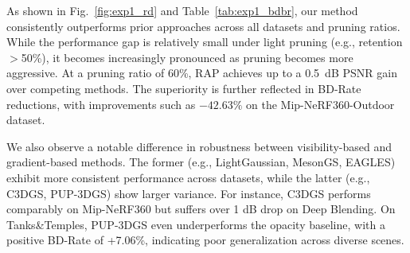\begin{table}[t]
    \centering
    \caption{BD-Rate (\%) comparison of pruning-based Gaussian Splatting methods relative to the opacity baseline. Lower BD-Rate indicates better rate–distortion efficiency}
    \label{tab:exp1_bdbr}
    \vspace{-1.5em}
\end{table}
As shown in Fig.~\ref{fig:exp1_rd} and Table~\ref{tab:exp1_bdbr}, our method consistently outperforms prior approaches across all datasets and pruning ratios. 
While the performance gap is relatively small under light pruning (e.g., retention $>$50\%), it becomes increasingly pronounced as pruning becomes more aggressive. 
At a pruning ratio of 60\%, RAP achieves up to a 0.5~dB PSNR gain over competing methods. 
The superiority is further reflected in BD-Rate reductions, with improvements such as $-42.63\%$ on the Mip-NeRF360-Outdoor dataset.


We also observe a notable difference in robustness between visibility-based and gradient-based methods. The former (e.g., LightGaussian, MesonGS, EAGLES) exhibit more consistent performance across datasets, while the latter (e.g., C3DGS, PUP-3DGS) show larger variance. For instance, C3DGS performs comparably on Mip-NeRF360 but suffers over 1 dB drop on Deep Blending. On Tanks\&Temples, PUP-3DGS even underperforms the opacity baseline, with a positive BD-Rate of {+7.06\%}, indicating poor generalization across diverse scenes.

